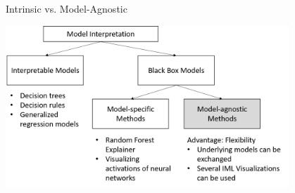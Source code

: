 \documentclass[11pt,compress,t,notes=noshow, aspectratio=169, xcolor=table]{beamer}
\begin{document}
\begin{frame}{Intrinsic vs. Model-Agnostic}
	\begin{center}
		\includegraphics[width=0.8\textwidth]{figure/overview}
	\end{center}
\end{frame}
\end{document}
